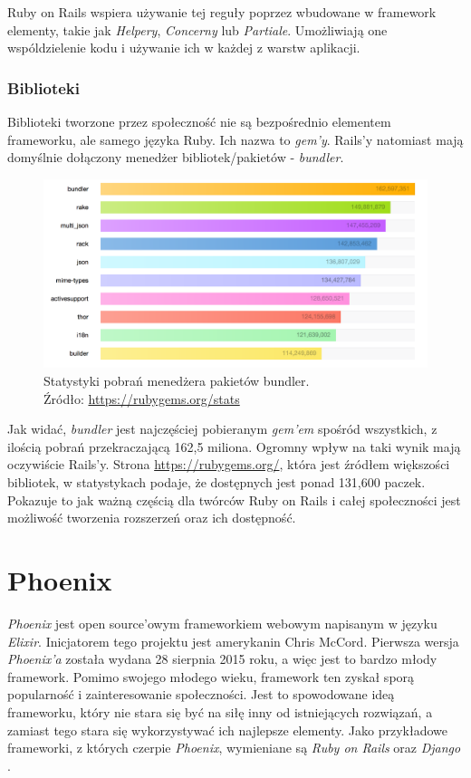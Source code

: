 Ruby on Rails wspiera używanie tej reguły poprzez wbudowane w framework elementy, takie jak \textit{Helpery}, \textit{Concerny} lub \textit{Partiale}. Umożliwiają one wspóldzielenie kodu i używanie ich w każdej z warstw aplikacji.

\subsubsection{Biblioteki}
Biblioteki tworzone przez społeczność nie są bezpośrednio elementem frameworku, ale samego języka Ruby. Ich nazwa to \textit{gem'y}. Rails'y natomiast mają domyślnie dołączony menedżer bibliotek/pakietów - \textit{bundler}.

\begin{figure}[h]
  \centering
  \includegraphics[width=\linewidth]{images/bundler_stats}
  \caption{Statystyki pobrań menedżera pakietów bundler.\\Źródło: \url{https://rubygems.org/stats}}
  \label{fig:bundler_stats}
\end{figure}

Jak widać, \textit{bundler} jest najczęściej pobieranym \textit{gem'em} spośród wszystkich, z ilością pobrań przekraczającą 162,5 miliona. Ogromny wpływ na taki wynik mają oczywiście Rails'y. Strona \url{https://rubygems.org/}, która jest źródłem większości bibliotek, w statystykach podaje, że dostępnych jest ponad 131,600 paczek. Pokazuje to jak ważną częścią dla twórców Ruby on Rails i całej społeczności jest możliwość tworzenia rozszerzeń oraz ich dostępność.

\section{Phoenix} %

\textit{Phoenix} jest open source'owym frameworkiem webowym napisanym w języku \textit{Elixir}. Inicjatorem tego projektu jest amerykanin Chris McCord. Pierwsza wersja \textit{Phoenix'a} została wydana 28 sierpnia 2015 roku, a więc jest to bardzo młody framework. Pomimo swojego młodego wieku, framework ten zyskał sporą popularność i zainteresowanie społeczności. Jest to spowodowane ideą frameworku, który nie stara się być na siłę inny od istniejących rozwiązań, a zamiast tego stara się wykorzystywać ich najlepsze elementy. Jako przykładowe frameworki, z których czerpie \textit{Phoenix}, wymieniane są \textit{Ruby on Rails} oraz \textit{Django} \cite{phoenix_docs}.

